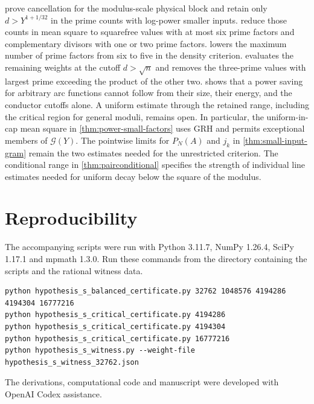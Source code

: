 \documentclass[11pt,a4paper]{article}
\numberwithin{equation}{section}
\begin{document}
prove cancellation for the modulus-scale physical block and
retain only $d>Y^{1+1/32}$ in the prime counts with
log-power smaller inputs.
reduce those counts in mean square to squarefree values
with at most six prime factors and complementary
divisors with one or two prime factors.
 lowers the maximum
number of prime factors from six to five in the density
criterion.
 evaluates the remaining weights
at the cutoff $d>\sqrt n$ and removes the three-prime values
with largest prime exceeding the product of the other two.
 shows that a power saving
for arbitrary arc functions cannot follow from their size,
their energy, and the conductor cutoffs alone.
A uniform estimate through the retained range, including the
critical region for general moduli, remains open.
In particular, the uniform-in-cap mean square in
\cref{thm:power-small-factors} uses GRH and permits exceptional
members of $\mathcal G(Y)$. The pointwise limits for $P_N(A)$
and $j_k$ in \cref{thm:small-input-gram} remain the two estimates
needed for the unrestricted criterion.
The conditional range in \cref{thm:pairconditional} specifies
the strength of individual line estimates needed for uniform
decay below the square of the modulus.

\section*{Reproducibility}

The accompanying scripts were run with Python 3.11.7, NumPy 1.26.4,
SciPy 1.17.1 and mpmath 1.3.0. Run these commands from the directory
containing the scripts and the rational witness data.

{\small
\begin{verbatim}
python hypothesis_s_balanced_certificate.py 32762 1048576 4194286 4194304 16777216
python hypothesis_s_critical_certificate.py 4194286
python hypothesis_s_critical_certificate.py 4194304
python hypothesis_s_critical_certificate.py 16777216
python hypothesis_s_witness.py --weight-file hypothesis_s_witness_32762.json
\end{verbatim}
}

The derivations, computational code and manuscript were developed
with OpenAI Codex assistance.
\end{document}

